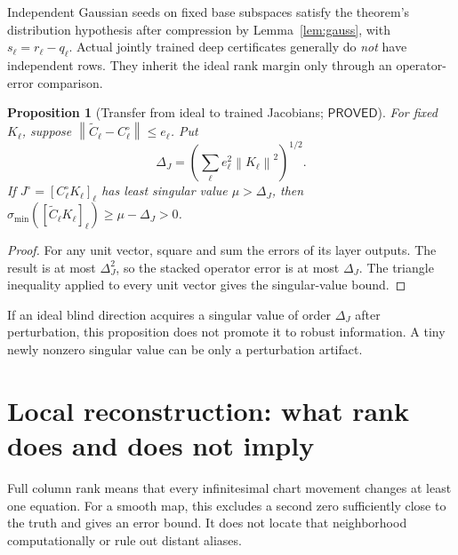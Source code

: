 \documentclass[12pt,a4paper]{article}
\theoremstyle{readable}
\newtheorem{proposition}[theorem]{Proposition}
\theoremstyle{definition}\newtheorem{example}[theorem]{Example}
\newcommand{\norm}[1]{\left\|#1\right\|}
\newcommand{\PP}{\mathsf{PROVED}}\newcommand{\FF}{\mathsf{FALSE}}
\begin{document}
Independent Gaussian seeds on fixed base subspaces satisfy the theorem's distribution hypothesis after compression by Lemma~\ref{lem:gauss}, with \(s_\ell=r_\ell-q_\ell\). Actual jointly trained deep certificates generally do \emph{not} have independent rows. They inherit the ideal rank margin only through an operator-error comparison.

\begin{proposition}[Transfer from ideal to trained Jacobians; \(\PP\)]\label{prop:transfer}
For fixed \(K_\ell\), suppose
\(\norm{\widetilde C_\ell-C_\ell^\circ}\le e_\ell\). Put
\[
\Delta_J=\left(\sum_\ell e_\ell^2\norm{K_\ell}^2\right)^{1/2}.
\]
If \(J^\circ=[C_\ell^\circ K_\ell]_\ell\) has least singular value \(\mu>\Delta_J\), then
\(\sigma_{\min}([\widetilde C_\ell K_\ell]_\ell)\ge\mu-\Delta_J>0\).
\end{proposition}
\begin{proof}
For any unit vector, square and sum the errors of its layer outputs. The result is at most \(\Delta_J^2\), so the stacked operator error is at most \(\Delta_J\). The triangle inequality applied to every unit vector gives the singular-value bound.
\end{proof}
If an ideal blind direction acquires a singular value of order \(\Delta_J\) after perturbation, this proposition does not promote it to robust information. A tiny newly nonzero singular value can be only a perturbation artifact.

\section{Local reconstruction: what rank does and does not imply}
\label{sec:local}

Full column rank means that every infinitesimal chart movement changes at least one equation. For a smooth map, this excludes a second zero sufficiently close to the truth and gives an error bound. It does not locate that neighborhood computationally or rule out distant aliases.
\end{document}
